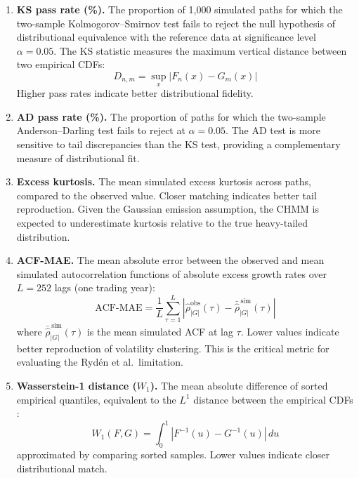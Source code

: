 \begin{enumerate}
    \item \textbf{KS pass rate (\%).}
    The proportion of 1,000 simulated paths for which the two-sample Kolmogorov--Smirnov test \citep{kolmogorov1933, smirnov1948} fails to reject the null hypothesis of distributional equivalence with the reference data at significance level $\alpha = 0.05$.
    The KS statistic measures the maximum vertical distance between two empirical CDFs:
    \begin{equation}
        D_{n,m} = \sup_x |F_n(x) - G_m(x)|
        \label{eq:ks}
    \end{equation}
    Higher pass rates indicate better distributional fidelity.

    \item \textbf{AD pass rate (\%).}
    The proportion of paths for which the two-sample Anderson--Darling test fails to reject at $\alpha = 0.05$.
    The AD test is more sensitive to tail discrepancies than the KS test, providing a complementary measure of distributional fit.

    \item \textbf{Excess kurtosis.}
    The mean simulated excess kurtosis across paths, compared to the observed value.
    Closer matching indicates better tail reproduction.
    Given the Gaussian emission assumption, the CHMM is expected to underestimate kurtosis relative to the true heavy-tailed distribution.

    \item \textbf{ACF-MAE.}
    The mean absolute error between the observed and mean simulated autocorrelation functions of absolute excess growth rates over $L = 252$ lags (one trading year):
    \begin{equation}
        \text{ACF-MAE} = \frac{1}{L} \sum_{\tau=1}^{L} \left|\hat{\rho}^{\text{obs}}_{|G|}(\tau) - \bar{\hat{\rho}}^{\,\text{sim}}_{|G|}(\tau)\right|
        \label{eq:acf_mae}
    \end{equation}
    where $\bar{\hat{\rho}}^{\,\text{sim}}_{|G|}(\tau)$ is the mean simulated ACF at lag $\tau$.
    Lower values indicate better reproduction of volatility clustering.
    This is the critical metric for evaluating the Ryd\'{e}n et al.\ limitation.

    \item \textbf{Wasserstein-1 distance ($W_1$).}
    The mean absolute difference of sorted empirical quantiles, equivalent to the $L^1$ distance between the empirical CDFs \citep{glasserman2003monte}:
    \begin{equation}
        W_1(F, G) = \int_0^1 |F^{-1}(u) - G^{-1}(u)|\,du
        \label{eq:wasserstein}
    \end{equation}
    approximated by comparing sorted samples.
    Lower values indicate closer distributional match.


\end{enumerate}
